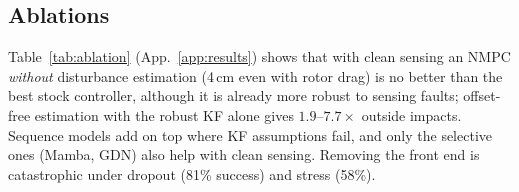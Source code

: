 \subsection{Ablations}
\label{sec:ablation}
Table~\ref{tab:ablation} (App.~\ref{app:results}) shows that with clean sensing an NMPC \emph{without} disturbance estimation (4\,cm even with rotor drag) is no better than the best stock controller, although it is already more robust to sensing faults; offset-free estimation with the robust KF alone gives $1.9$--$7.7\times$ outside impacts. Sequence models add on top where KF assumptions fail, and only the selective ones (Mamba, GDN) also help with clean sensing. Removing the front end is catastrophic under dropout (81\% success) and stress (58\%).
